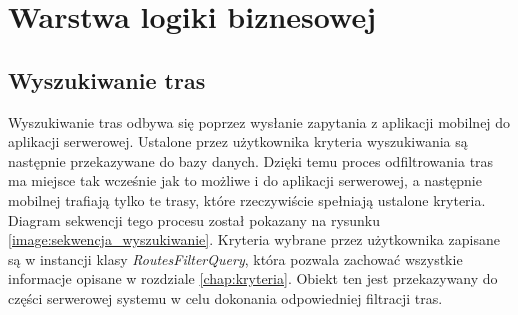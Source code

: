 \section{Warstwa logiki biznesowej}
\subsection{Wyszukiwanie tras}
Wyszukiwanie tras odbywa się poprzez wysłanie zapytania z aplikacji mobilnej do aplikacji serwerowej. Ustalone przez użytkownika kryteria wyszukiwania są następnie przekazywane do bazy danych. Dzięki temu proces odfiltrowania tras ma miejsce tak wcześnie jak to możliwe i do aplikacji serwerowej, a następnie mobilnej trafiają tylko te trasy, które rzeczywiście spełniają ustalone kryteria. Diagram sekwencji tego procesu został pokazany na rysunku \ref{image:sekwencja_wyszukiwanie}. Kryteria wybrane przez użytkownika zapisane są w instancji klasy \textit{RoutesFilterQuery}, która pozwala zachować wszystkie informacje opisane w rozdziale \ref{chap:kryteria}. Obiekt ten jest przekazywany do części serwerowej systemu w celu dokonania odpowiedniej filtracji tras.

